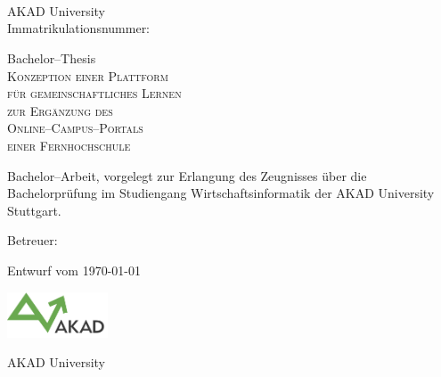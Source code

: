 

\begin{titlepage}


\vspace{5cm}

\Name \\ 
\Strasse \\ 
\PlzOrt\\ 
\href{mailto:\Email}{\Email}

AKAD University\\
Immatrikulationsnummer: \Immatrikulationsnummer

\vfill

Bachelor--Thesis\\
\LARGE
\textsc{Konzeption einer Plattform\\
für gemeinschaftliches Lernen\\
zur Ergänzung des \\
Online--Campus--Portals\\
einer Fernhochschule}

\vfill

\normalsize

Bachelor--Arbeit, vorgelegt zur Erlangung des Zeugnisses über die Bachelorprüfung im Studiengang Wirtschaftsinformatik der AKAD University Stuttgart.

Betreuer: \Betreuer

Entwurf vom \today %


\vfill

\includegraphics[width=3cm]{akad_logo.png}  

AKAD University 

\end{titlepage}



\normalsize
